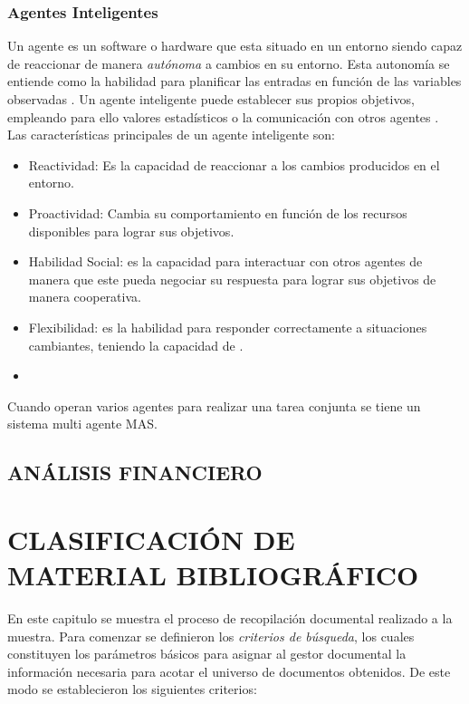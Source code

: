 \documentclass[12pt, letterpaper]{report}
\begin{document}
\subsection{Agentes Inteligentes}
Un agente es un software o hardware que esta situado en un entorno siendo  capaz de reaccionar de manera \textit{autónoma} a  cambios en su entorno. Esta autonomía se entiende como la habilidad para planificar las entradas en función de las variables observadas \cite{McArthur2007}. Un agente inteligente puede establecer sus propios objetivos, empleando para ello valores estadísticos o la comunicación con otros agentes \cite{Mahmud2016}.\\ Las características principales de un  agente inteligente son:
\begin{itemize}
	\item Reactividad: Es la capacidad de reaccionar a los cambios producidos en el entorno.
	\item Proactividad: Cambia su comportamiento en función de los recursos disponibles para lograr sus objetivos.  
	\item Habilidad Social: es la capacidad para interactuar con otros agentes de manera que este pueda negociar su respuesta  para lograr sus objetivos de manera cooperativa.
	\item Flexibilidad: es la habilidad para responder correctamente a situaciones cambiantes, teniendo la capacidad de .
	\item  
\end{itemize}
 
Cuando operan varios agentes para realizar una tarea conjunta se tiene un sistema multi agente \ac{MAS}.

\section{ANÁLISIS FINANCIERO}

\chapter{CLASIFICACIÓN DE MATERIAL BIBLIOGRÁFICO}
En este capitulo se muestra el proceso de recopilación documental realizado a  la muestra. Para comenzar se definieron los \textit{criterios de búsqueda}, los cuales constituyen los parámetros básicos para asignar al gestor documental la información necesaria para acotar el universo de documentos obtenidos. De este modo se establecieron los siguientes criterios:\\
\end{document}
